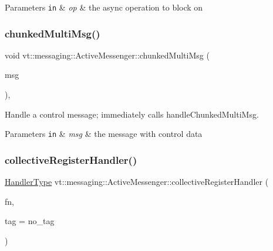 \begin{DoxyParams}[1]{Parameters}
\mbox{\tt in}  & {\em op} & the async operation to block on \\
\hline
\end{DoxyParams}
\mbox{\label{structvt_1_1messaging_1_1_active_messenger_ae8f6417a532c73601f9c26190a29a21e}} 
\subsubsection{\texorpdfstring{chunked\+Multi\+Msg()}{chunkedMultiMsg()}}
{\footnotesize\ttfamily void vt\+::messaging\+::\+Active\+Messenger\+::chunked\+Multi\+Msg (\begin{DoxyParamCaption}\item[{\hyperlink{structvt_1_1messaging_1_1_multi_msg}{Multi\+Msg} $\ast$}]{msg }\end{DoxyParamCaption})\hspace{0.3cm}{\ttfamily [static]}, {\ttfamily [private]}}



Handle a control message; immediately calls {\ttfamily handle\+Chunked\+Multi\+Msg}. 


\begin{DoxyParams}[1]{Parameters}
\mbox{\tt in}  & {\em msg} & the message with control data \\
\hline
\end{DoxyParams}
\mbox{\label{structvt_1_1messaging_1_1_active_messenger_a7e693e4b292e45fc1ed0dc8c9e2c03ec}} 
\subsubsection{\texorpdfstring{collective\+Register\+Handler()}{collectiveRegisterHandler()}}
{\footnotesize\ttfamily \hyperlink{namespacevt_af64846b57dfcaf104da3ef6967917573}{Handler\+Type} vt\+::messaging\+::\+Active\+Messenger\+::collective\+Register\+Handler (\begin{DoxyParamCaption}\item[{\hyperlink{namespacevt_a2a06c34cafcd511828f16cbf1476b924}{Active\+Closure\+Fn\+Type}}]{fn,  }\item[{\hyperlink{namespacevt_a84ab281dae04a52a4b243d6bf62d0e52}{Tag\+Type} const \&}]{tag = {\ttfamily no\+\_\+tag} }\end{DoxyParamCaption})}



